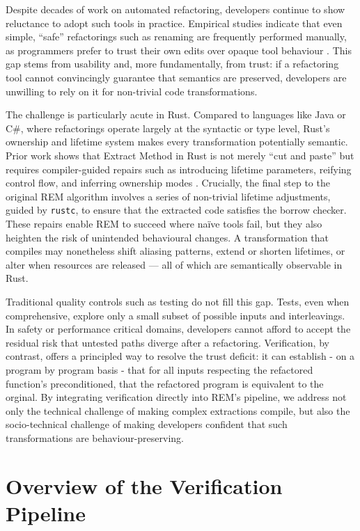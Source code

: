 Despite decades of work on automated refactoring, developers continue to show
reluctance to adopt such tools in practice. Empirical studies indicate that even
simple, “safe” refactorings such as renaming are frequently performed manually,
as programmers prefer to trust their own edits over opaque tool behaviour
\cite{OneThousandOneStories-SoftwareRefactoring}. This gap stems from usability
and, more fundamentally, from trust: if a refactoring tool cannot convincingly
guarantee that semantics are preserved, developers are unwilling to rely on it
for non-trivial code transformations.

The challenge is particularly acute in Rust. Compared to languages like Java or
C\#, where refactorings operate largely at the syntactic or type level, Rust's
ownership and lifetime system makes every transformation potentially semantic.
Prior work shows that Extract Method in Rust is not merely ``cut and paste'' but
requires compiler-guided repairs such as introducing lifetime parameters,
reifying control flow, and inferring ownership modes
\cite{AdventureOfALifetime}. Crucially, the final step to the original REM
algorithm involves a series of non-trivial lifetime adjustments, guided by
\verb|rustc|, to ensure that the extracted code satisfies the borrow checker.
These repairs enable REM to succeed where na\"ive tools fail, but they also
heighten the risk of unintended behavioural changes. A transformation that
compiles may nonetheless shift aliasing patterns, extend or shorten lifetimes,
or alter when resources are released — all of which are semantically observable
in Rust.

Traditional quality controls such as testing do not fill this gap. Tests, even
when comprehensive, explore only a small subset of possible inputs and
interleavings. In safety or performance critical domains, developers cannot
afford to accept the residual risk that untested paths diverge after a
refactoring. Verification, by contrast, offers a principled way to resolve the
trust deficit: it can establish - on a program by program basis - that for all
inputs respecting the refactored function's preconditioned, that the refactored
program is equivalent to the orginal. By integrating verification directly into
REM's pipeline, we address not only the technical challenge of making complex
extractions compile, but also the socio-technical challenge of making developers
confident that such transformations are behaviour-preserving.

\newpage
\section{Overview of the Verification Pipeline}
\label{verification pipeline}

